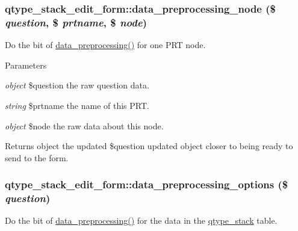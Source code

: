 \hypertarget{classqtype__stack__edit__form_a63b02f4a1cb4b1e3addbc437fb705161}{
\subsubsection[{data\_\-preprocessing\_\-node}]{\setlength{\rightskip}{0pt plus 5cm}qtype\_\-stack\_\-edit\_\-form::data\_\-preprocessing\_\-node (\$ {\em question}, \/  \$ {\em prtname}, \/  \$ {\em node})}}
\label{classqtype__stack__edit__form_a63b02f4a1cb4b1e3addbc437fb705161}
Do the bit of \hyperlink{classqtype__stack__edit__form_a3a6f3817b03966c85e356ac8ca5cf282}{data\_\-preprocessing()} for one PRT node. 
\begin{DoxyParams}{Parameters}
\item[{\em object}]\$question the raw question data. \item[{\em string}]\$prtname the name of this PRT. \item[{\em object}]\$node the raw data about this node. \end{DoxyParams}
\begin{DoxyReturn}{Returns}
object the updated \$question updated object closer to being ready to send to the form. 
\end{DoxyReturn}
\hypertarget{classqtype__stack__edit__form_af17c9829d24c27226c62a059c209227a}{
\subsubsection[{data\_\-preprocessing\_\-options}]{\setlength{\rightskip}{0pt plus 5cm}qtype\_\-stack\_\-edit\_\-form::data\_\-preprocessing\_\-options (\$ {\em question})}}
\label{classqtype__stack__edit__form_af17c9829d24c27226c62a059c209227a}
Do the bit of \hyperlink{classqtype__stack__edit__form_a3a6f3817b03966c85e356ac8ca5cf282}{data\_\-preprocessing()} for the data in the \hyperlink{classqtype__stack}{qtype\_\-stack} table. 
